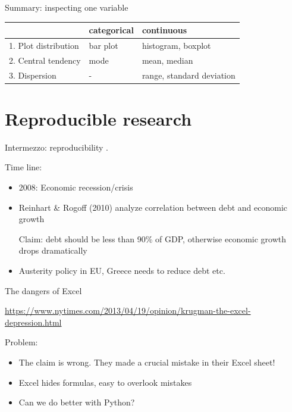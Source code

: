 \documentclass[aspectratio=169,usenames,dvipsnames]{beamer}
\begin{document}
\begin{frame}{Summary: inspecting one variable}
\noindent\begin{tabular}{@{}lll} & categorical & continuous \\ \midrule
        1. Plot distribution     & bar plot    & histogram, boxplot \\
        2. Central tendency      & mode        & mean, median \\
        3. Dispersion            & -           & range, standard deviation \\
\end{tabular}
\end{frame}




\section{Reproducible research}
\frame{\tableofcontents[currentsubsection]}

\begin{frame}{Intermezzo: reproducibility}
    .

    Time line:
    \begin{itemize}
        \item 2008: Economic recession/crisis
        \item Reinhart \& Rogoff (2010) analyze correlation between debt and
            economic growth \\
            \begin{block}{Claim:}
            debt should be less than 90\% of GDP, otherwise economic growth
                drops dramatically
            \end{block}
        \item Austerity policy in EU, Greece needs to reduce debt etc.
    \end{itemize}
\end{frame}

\begin{frame}{The dangers of Excel}
    \begin{reference}
    \url{https://www.nytimes.com/2013/04/19/opinion/krugman-the-excel-depression.html}
    \end{reference}

    Problem:
    \begin{itemize}
        \item The claim is wrong.
            They made a crucial mistake in their Excel sheet!
        \item Excel hides formulas, easy to overlook mistakes
        \item Can we do better with Python?
    \end{itemize}

\end{frame}
\end{document}
